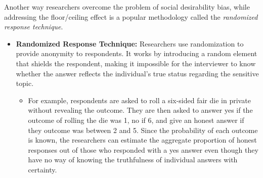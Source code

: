 \documentclass{article}
\begin{document}
    \noindent Another way researchers overcome the problem of social
desirability bias, while addressing the floor/ceiling effect is a popular
methodology called the \textit{randomized response technique}.
    \begin{itemize}
        \item \textbf{Randomized Response Technique:} Researchers use
        randomization to provide anonymity to respondents. It works by
        introducing a random element that shields the respondent, making it
        impossible for the interviewer to know whether the answer reflects
        the individual's true status regarding the sensitive topic.
        \begin{itemize}
            \item For example, respondents are asked to roll a six-sided
            fair die in private without revealing the outcome. They are then
            asked to answer yes if the outcome of rolling the die was 1, no
            if 6, and give an honest answer if they outcome was between 2
            and 5. Since the probability of each outcome is known, the
            researchers can estimate the aggregate proportion of honest
            responses out of those who responded with a yes answer even
            though they have no way of knowing the truthfulness of
            individual answers with certainty.
        \end{itemize}
    \end{itemize}
\end{document}
